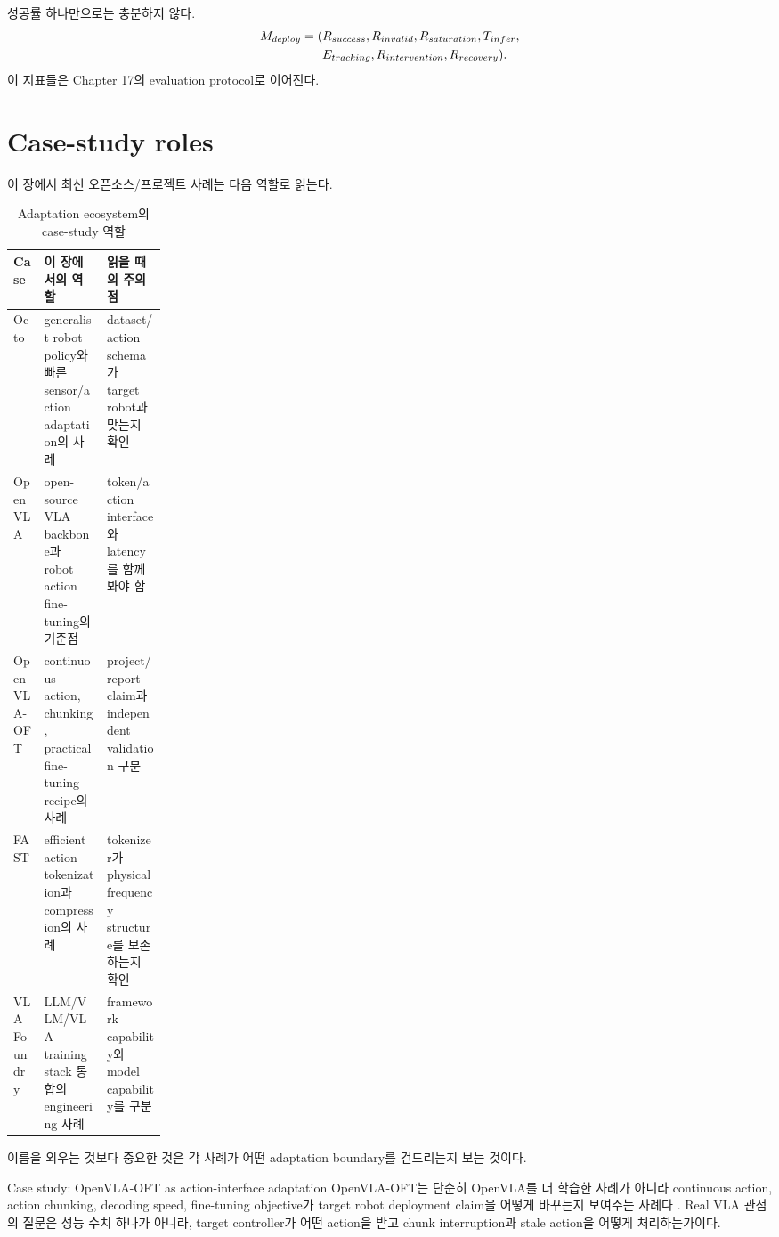 성공률 하나만으로는 충분하지 않다.
\begin{align}
  M_{deploy}
  =
  (&R_{success},
  R_{invalid},
  R_{saturation},
  T_{infer}, \notag\\
  &
  E_{tracking},
  R_{intervention},
  R_{recovery}).
  \label{eq:ch15-deployment-metrics}
\end{align}
이 지표들은 Chapter 17의 evaluation protocol로 이어진다.

\section{Case-study roles}

이 장에서 최신 오픈소스/프로젝트 사례는 다음 역할로 읽는다.
\begin{table}[h]
  \centering
  \caption{Adaptation ecosystem의 case-study 역할}
  \begin{tabularx}{\linewidth}{p{0.2\linewidth}X X}
    \toprule
    Case & 이 장에서의 역할 & 읽을 때의 주의점 \\
    \midrule
    Octo & generalist robot policy와 빠른 sensor/action adaptation의 사례 & dataset/action schema가 target robot과 맞는지 확인 \\
    OpenVLA & open-source VLA backbone과 robot action fine-tuning의 기준점 & token/action interface와 latency를 함께 봐야 함 \\
    OpenVLA-OFT & continuous action, chunking, practical fine-tuning recipe의 사례 & project/report claim과 independent validation 구분 \\
    FAST & efficient action tokenization과 compression의 사례 & tokenizer가 physical frequency structure를 보존하는지 확인 \\
    VLA Foundry & LLM/VLM/VLA training stack 통합의 engineering 사례 & framework capability와 model capability를 구분 \\
    \bottomrule
  \end{tabularx}
  \label{tab:ch15-case-study}
\end{table}

이름을 외우는 것보다 중요한 것은 각 사례가 어떤 adaptation boundary를 건드리는지 보는 것이다.

\begin{casebox}{Case study: OpenVLA-OFT as action-interface adaptation}
OpenVLA-OFT는 단순히 OpenVLA를 더 학습한 사례가 아니라 continuous action, action chunking, decoding speed, fine-tuning objective가 target robot deployment claim을 어떻게 바꾸는지 보여주는 사례다 \cite{openvlaoft2025}. Real VLA 관점의 질문은 성능 수치 하나가 아니라, target controller가 어떤 action을 받고 chunk interruption과 stale action을 어떻게 처리하는가이다.
\end{casebox}

